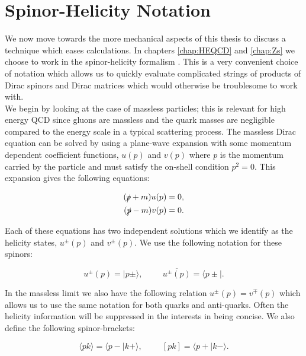 \section{Spinor-Helicity Notation}
	\label{sec:SpinorHelicity}

	We now move towards the more mechanical aspects of this thesis to discuss a technique which eases calculations.
	In chapters \ref{chap:HEQCD} and \ref{chap:Zs} we choose to work in the spinor-helicity formalism \cite{Dixon:1996wi,CBO9781107706620A004}.
	This is a very convenient choice of notation which allows us to quickly evaluate complicated strings of products of
	Dirac spinors and Dirac matrices which would otherwise be troublesome to work with.\\We begin by looking at the case
	of massless particles; this is relevant for high energy QCD since gluons are massless and the quark masses are
	negligible compared to the energy scale in a typical scattering process.  The massless Dirac equation can be solved
	by using a plane-wave expansion with some momentum dependent coefficient functions, $u(p)$ and $v(p)$ where $p$ is the
	momentum carried by the particle and must satisfy the on-shell condition $p^2=0$.  This expansion gives the following
	equations:

	\begin{align}
	\begin{split}
		(\slashed p + m)u(p) = 0, \\
		(\slashed p - m)v(p) = 0.
	\end{split}
	\end{align}

	Each of these equations has two independent solutions which we identify as the helicity states, $u^\pm(p)$ and $v^\pm(p)$.
	We use the following notation for these spinors:

	\begin{equation}
		u^\pm(p) = \mid p\pm\rangle, \hspace{1cm} \overline{u^\pm(p)} = \langle p\pm\mid.
	\end{equation}

	In the massless limit we also have the following relation $u^\pm(p) = v^\mp(p)$ which allows us to use the same notation for both
	quarks and anti-quarks.  Often the helicity information will be suppressed in the interests in being concise.  We also define the
	following spinor-brackets:

	\begin{equation}
		\langle pk\rangle = \langle p-\mid k+\rangle, \hspace{1cm} [pk] = \langle p+\mid k-\rangle.
	\end{equation}

